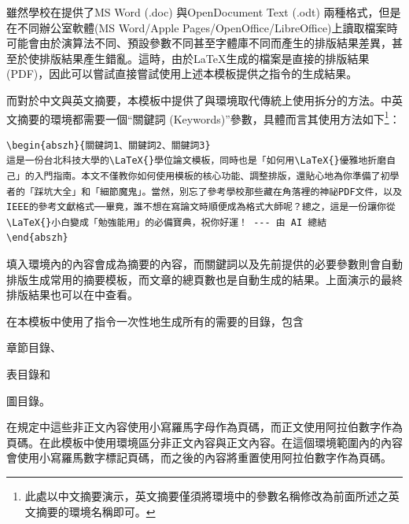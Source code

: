 \documentclass[12pt]{report}
\theoremstyle{plain}
\begin{document}
雖然學校在\cite{ntutsheet}提供了MS Word (.doc) 與OpenDocument Text (.odt) 兩種格式，但是在不同辦公室軟體(MS Word/Apple Pages/OpenOffice/LibreOffice)上讀取檔案時可能會由於演算法不同、預設參數不同甚至字體庫不同而產生的排版結果差異，甚至於使排版結果產生錯亂。這時，由於\LaTeX 生成的檔案是直接的排版結果(PDF)，因此可以嘗試直接嘗試使用上述本模板提供之指令的生成結果。

而對於中文與英文摘要，本模板中提供了與環境取代傳統上使用拆分的方法。中英文摘要的環境都需要一個``關鍵詞 (Keywords)''參數，具體而言其使用方法如下\footnote{此處以中文摘要演示，英文摘要僅須將環境中的參數名稱修改為前面所述之英文摘要的環境名稱即可。}：
\begin{lstlisting}
\begin{abszh}{關鍵詞1、關鍵詞2、關鍵詞3}
這是一份台北科技大學的\LaTeX{}學位論文模板，同時也是「如何用\LaTeX{}優雅地折磨自己」的入門指南。本文不僅教你如何使用模板的核心功能、調整排版，還貼心地為你準備了初學者的「踩坑大全」和「細節魔鬼」。當然，別忘了參考學校那些藏在角落裡的神祕PDF文件，以及IEEE的參考文獻格式──畢竟，誰不想在寫論文時順便成為格式大師呢？總之，這是一份讓你從\LaTeX{}小白變成「勉強能用」的必備寶典，祝你好運！ --- 由 AI 總結
\end{abszh}
\end{lstlisting}
填入環境內的內容會成為摘要的內容，而關鍵詞以及先前提供的必要參數則會自動排版生成常用的摘要模板，而文章的總頁數也是自動生成的結果。上面演示的最終排版結果也可以在中查看。

在本模板中使用了指令一次性地生成所有的需要的目錄，包含
\begin{enumerate*}
    \item 章節目錄、
    \item 表目錄和
    \item 圖目錄。
\end{enumerate*}
在規定中這些非正文內容使用小寫羅馬字母作為頁碼，而正文使用阿拉伯數字作為頁碼。在此模板中使用環境區分非正文內容與正文內容。在這個環境範圍內的內容會使用小寫羅馬數字標記頁碼，而之後的內容將重置使用阿拉伯數字作為頁碼。
\end{document}
